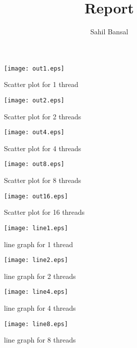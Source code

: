 \documentclass[a4paper, 10pt]{report}
\title{Report}
\author{Sahil Bansal}
\date{}
\begin{document}
\maketitle

\listoffigures

\begin{figure}
\centering
\texttt{[image: out1.eps]}
 \caption{Scatter plot for 1 thread}
 \label{fig:Scatter plot for 1 thread}
\end{figure}

\begin{figure}
\centering
\texttt{[image: out2.eps]}
 \caption{Scatter plot for 2 threads}
 \label{fig:Scatter plot for 2 threads}
\end{figure}

\begin{figure}
\centering
\texttt{[image: out4.eps]}
 \caption{Scatter plot for 4 threads}
 \label{fig:Scatter plot for 4 threads}
\end{figure}

\begin{figure}
\centering
\texttt{[image: out8.eps]}
 \caption{Scatter plot for 8 threads}
 \label{fig:Scatter plot for 8 threads}
\end{figure}

\begin{figure}
\centering
\texttt{[image: out16.eps]}
 \caption{Scatter plot for 16 threads}
 \label{fig:Scatter plot for 16 threads}
\end{figure}

\begin{figure}
\centering
\texttt{[image: line1.eps]}
 \caption{line graph for 1 thread}
 \label{fig:line graph for 1 thread}
\end{figure}

\begin{figure}
\centering
\texttt{[image: line2.eps]}
 \caption{line graph for 2 threads}
 \label{fig:line graph for 2 threads}
\end{figure}

\begin{figure}
\centering
\texttt{[image: line4.eps]}
 \caption{line graph for 4 threads}
 \label{fig:line graph for 4 threads}
\end{figure}

\begin{figure}
\centering
\texttt{[image: line8.eps]}
 \caption{line graph for 8 threads}
 \label{fig:line graph for 8 threads}
\end{figure}
\end{document}
